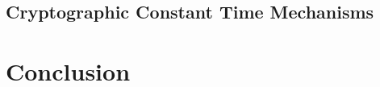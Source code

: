 \documentclass[utf8,acmsmall,review,screen,dvipsnames]{acmart}
\begin{document}
\subsection{Cryptographic Constant Time Mechanisms}\label{subsec:relw:cctmechs}

\section{Conclusion}\label{sec:concl}


\begin{acks}
\end{acks}




\appendix
\end{document}
